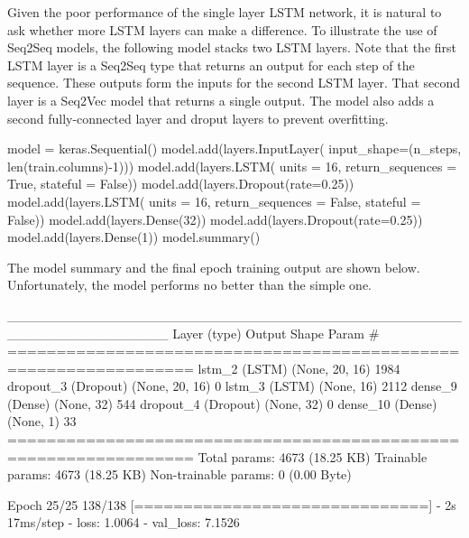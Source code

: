 Given the poor performance of the single layer LSTM network, it is natural to ask whether more LSTM layers can make a difference. To illustrate the use of Seq2Seq models, the following model stacks two LSTM layers. Note that the first LSTM layer is a Seq2Seq type that returns an output for each step of the sequence. These outputs form the inputs for the second LSTM layer. That second layer is a Seq2Vec model that returns a single output. The model also adds a second fully-connected layer and droput layers to prevent overfitting. 

\begin{samepage}
\begin{pythoncode}
model = keras.Sequential()
model.add(layers.InputLayer(
    input_shape=(n_steps, len(train.columns)-1)))
model.add(layers.LSTM(
    units = 16, 
    return_sequences = True, 
    stateful = False))
model.add(layers.Dropout(rate=0.25))
model.add(layers.LSTM(
    units = 16, 
    return_sequences = False, 
    stateful = False))
model.add(layers.Dense(32))
model.add(layers.Dropout(rate=0.25))
model.add(layers.Dense(1))
model.summary()
\end{pythoncode}
\end{samepage}

The model summary and the final epoch training output are shown below. Unfortunately, the model performs no better than the simple one.

\begin{samepage}
\begin{textcode}
_________________________________________________________________
 Layer (type)                Output Shape              Param #   
=================================================================
 lstm_2 (LSTM)               (None, 20, 16)            1984      
 dropout_3 (Dropout)         (None, 20, 16)            0         
 lstm_3 (LSTM)               (None, 16)                2112      
 dense_9 (Dense)             (None, 32)                544       
 dropout_4 (Dropout)         (None, 32)                0         
 dense_10 (Dense)            (None, 1)                 33        
=================================================================
Total params: 4673 (18.25 KB)
Trainable params: 4673 (18.25 KB)
Non-trainable params: 0 (0.00 Byte)

Epoch 25/25
138/138 [==============================] - 2s 17ms/step 
- loss: 1.0064 - val_loss: 7.1526
\end{textcode}
\end{samepage}

